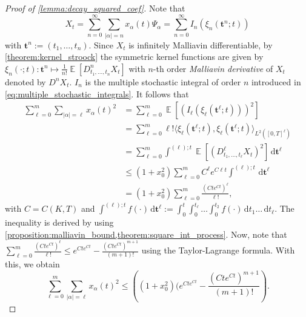 \documentclass[12pt]{article}
\theoremstyle{remark}
\theoremstyle{plain}
\numberwithin{equation}{section}
\newcommand{\dd}{\ensuremath{\,\mathrm d}}
\DeclareMathOperator{\E}{\mathbb E}
\begin{document}
\begin{proof}[Proof of \cref{lemma:decay_squared_coef}]
    Note that
    \begin{equation*}
        X_t = \sum_{n=0}^\infty \sum_{|\alpha|=n}x_\alpha(t)\Psi_\alpha = \sum_{n=0}^\infty I_n(\xi_n(\mathbf t^n; t))
    \end{equation*}
    with $\mathbf t^n := (t_1,\dots,t_n)$. Since $X_t$ is infinitely Malliavin differentiable, by \cref{theorem:kernel_stroock} the symmetric kernel functions are given by $\xi_n(\cdot; t) : \mathbf t^n \mapsto \frac{1}{n!}\E[D_{t_1,\dots,t_n}^n X_t]$ with $n$-th order \emph{Malliavin derivative} of $X_t$ denoted by $D^n X_t$. $I_n$ is the multiple stochastic integral of order $n$ introduced in \cref{eq:multiple_stochastic_integrals}.
    It follows that
    \begin{align*}
        \sum_{\ell=0}^m\sum_{|\alpha|=\ell}x_\alpha(t)^2&= \sum_{\ell=0}^m \E[(I_\ell(\xi_\ell(\mathbf t^\ell; t)))^2]\\
        &=\sum_{\ell=0}^m \ell! \langle \xi_\ell(\mathbf t^\ell; t), \xi_\ell(\mathbf t^\ell; t) \rangle_{L^2([0,T]^\ell)}\\
        &= \sum_{\ell=0}^m \int^{(\ell);t}\E[(D_{t_1,\dots,t_\ell}^\ell X_t)^2]\dd \mathbf t^\ell\\
        &\leq (1+x_0^2)\sum_{\ell=0}^m C^\ell e^{C\ell t} \int^{(\ell);t} \dd \mathbf t^\ell\\
        &= (1+x_0^2)\sum_{\ell=0}^m \frac{(Cte^{Ct})^\ell}{\ell!},
    \end{align*}
    with $C = C(K, T)$ and $\int^{(\ell);t} f(\cdot)\dd\mathbf t^\ell := \int_0^t \int_0^{t_\ell} \dots \int_0^{t_2} f(\cdot) \dd t_1 \dots \dd t_\ell$.
    The inequality is derived by using \cref{proposition:malliavin_bound,theorem:square_int_process}.
    Now, note that $\sum_{\ell=0}^m \frac{(Cte^{Ct})^\ell}{\ell!} \leq e^{Cte^{Ct}} - \frac{(Cte^{Ct})^{m+1}}{(m+1)!}$ using the Taylor-Lagrange formula.
    With this, we obtain
    \begin{equation*}                   \sum_{\ell=0}^m\sum_{|\alpha|=\ell}x_\alpha(t)^2 \leq \left((1+x_0^2)(e^{Cte^{Ct}} - \frac{(Cte^{Ct})^{m+1}}{(m+1)!}\right).%
    \end{equation*}
\end{proof}
\end{document}
